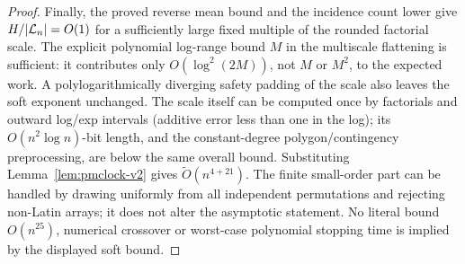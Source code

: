 \begin{proof}
Finally, the proved reverse mean bound and the incidence count lower
give $H/|\mathcal L_n|=O(1)$ for a sufficiently large fixed multiple of the
rounded factorial scale. The explicit polynomial log-range bound $M$
in the multiscale flattening is sufficient: it contributes only
$O(\log^2(2M))$, not $M$ or $M^2$, to the expected work.
A polylogarithmically diverging safety padding of the scale also
leaves the soft exponent unchanged. The scale itself can be computed
once by factorials and outward log/exp intervals (additive error less
than one in the log); its $O(n^2\log n)$-bit length, and the
constant-degree polygon/contingency preprocessing, are below the same
overall bound. Substituting Lemma~\ref{lem:pmclock-v2} gives
$\widetilde O(n^{4+21})$. The finite small-order part can be handled
by drawing uniformly from all independent permutations and rejecting
non-Latin arrays; it does not alter the asymptotic statement. No
literal bound $O(n^{25})$, numerical crossover or worst-case
polynomial stopping time is implied by the displayed soft bound.
\end{proof}
